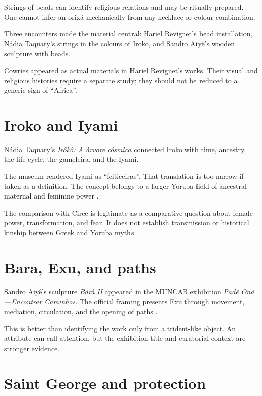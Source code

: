 Strings of beads can identify religious
relations and may be ritually prepared.
One cannot infer an orix\'a mechanically
from any necklace or colour combination.

Three encounters made the material central:
Hariel Revignet's bead installation,
N\'adia Taquary's strings in the colours of
Iroko, and Sandro Aiy\^e's wooden sculpture
with beads.

Cowries appeared as actual materials in
Hariel Revignet's works.  Their visual and
religious histories require a separate
study; they should not be reduced to a
generic sign of ``Africa''.

\section{Iroko and Iyami}
\label{section-iroko-iyami}

N\'adia Taquary's
\emph{Ir\^ok\^o: A \`arvore c\'osmica}
connected Iroko with time, ancestry, the
life cycle, the gameleira, and the Iyami.

The museum rendered Iyami as
``feiticeiras''.  That translation is too
narrow if taken as a definition.  The
concept belongs to a larger Yoruba field of
ancestral maternal and feminine power
\cite{santos2008iyami}.

The comparison with Circe is legitimate as
a comparative question about female power,
transformation, and fear.  It does not
establish transmission or historical
kinship between Greek and Yoruba myths.

\section{Bara, Exu, and paths}
\label{section-bara-exu-paths}

Sandro Aiy\^e's sculpture
\emph{B\'ar\`a II} appeared in the MUNCAB
exhibition
\emph{Pad\^e On\~a---Encontrar Caminhos}.
The official framing presents Exu through
movement, mediation, circulation, and the
opening of paths
\cite{muncab2026padeona}.

This is better than identifying the work
only from a trident-like object.  An
attribute can call attention, but the
exhibition title and curatorial context are
stronger evidence.

\section{Saint George and protection}
\label{section-saint-george}

